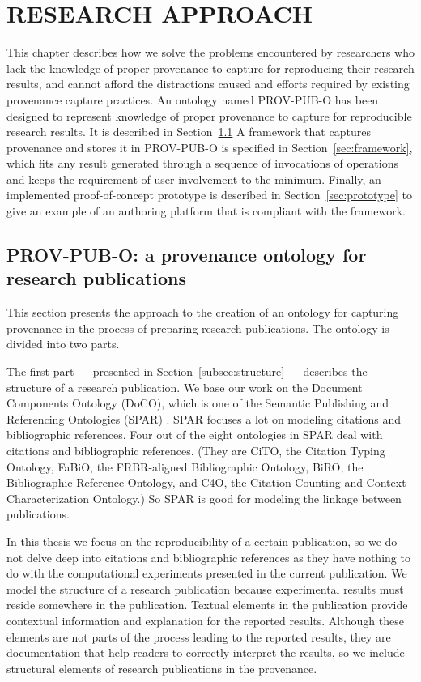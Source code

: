 \chapter{RESEARCH APPROACH}
\label{research-approach}

This chapter describes how we solve the problems encountered by researchers who lack the knowledge of proper provenance to capture for reproducing their research results, and cannot afford the distractions caused and efforts required by existing provenance capture practices. An ontology named PROV-PUB-O has been designed to represent knowledge of proper provenance to capture for reproducible research results. It is described in Section~\ref{sec:ontology} A framework that captures provenance and stores it in PROV-PUB-O is specified in Section~\ref{sec:framework}, which fits any result generated through a sequence of invocations of operations and keeps the requirement of user involvement to the minimum. Finally, an implemented proof-of-concept prototype is described in Section~\ref{sec:prototype} to give an example of an authoring platform that is compliant with the framework.

\section{PROV-PUB-O: a provenance ontology for research publications}
\label{sec:ontology}
This section presents the approach to the creation of an ontology for capturing provenance in the process of preparing research publications. The ontology is divided into two parts. 

The first part --- presented in Section~\ref{subsec:structure} --- describes the structure of a research publication. We base our work on the Document Components Ontology (DoCO), which is one of the Semantic Publishing and Referencing Ontologies (SPAR) \cite{peroni2014semantic}. SPAR focuses a lot on modeling citations and bibliographic references. Four out of the eight ontologies in SPAR deal with citations and bibliographic references. (They are CiTO, the Citation Typing Ontology, FaBiO, the FRBR-aligned Bibliographic Ontology, BiRO, the Bibliographic Reference Ontology, and C4O, the Citation Counting and Context Characterization Ontology.) So SPAR is good for modeling the linkage between publications. 

In this thesis we focus on the reproducibility of a certain publication, so we do not delve deep into citations and bibliographic references as they have nothing to do with the computational experiments presented in the current publication. We model the structure of a research publication because experimental results must reside somewhere in the publication. Textual elements in the publication provide contextual information and explanation for the reported results. Although these elements are not parts of the process leading to the reported results, they are documentation that help readers to correctly interpret the results, so we include structural elements of research publications in the provenance.

